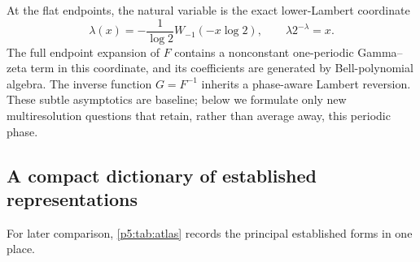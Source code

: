 \documentclass[11pt,oneside]{article}
\theoremstyle{definition}
\begin{document}
At the flat endpoints, the natural variable is the exact lower-Lambert
coordinate~\cite{p5:corless1996}
\begin{equation}
 \lambda(x)=-\frac{1}{\log2}
 W_{-1}(-x\log2),
 \qquad \lambda2^{-\lambda}=x.                           \label{p5:eq:lower-lambert}
\end{equation}
The full endpoint expansion of $F$ contains a nonconstant one-periodic
Gamma--zeta term in this coordinate, and its coefficients are generated by
Bell-polynomial algebra.  The inverse function $G=F^{-1}$ inherits a
phase-aware Lambert reversion.  These subtle asymptotics are baseline; below
we formulate only new multiresolution questions that retain, rather than
average away, this periodic phase.

\subsection{A compact dictionary of established representations}

For later comparison, \cref{p5:tab:atlas} records the principal established
forms in one place.
\end{document}
